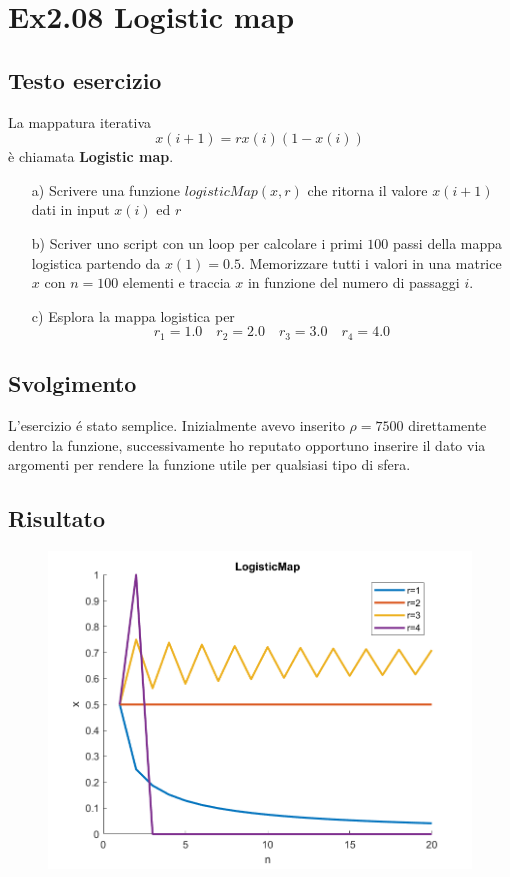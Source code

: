 \section{Ex2.08 Logistic map}\label{sec:LogisticMap}

\subsection{Testo esercizio}
La mappatura iterativa $$x(i+1)=rx(i)(1-x(i))$$ è chiamata \textbf{Logistic map}.

\begin{itemize}
    \item[a)] Scrivere una funzione $logisticMap(x,r)$ che ritorna il valore $x(i+1)$ 
    dati in input $x(i)$ ed $r$
    
    \item[b)] Scriver uno script con un loop per calcolare i primi $100$ passi della 
    mappa logistica partendo da $x(1)=0.5$. Memorizzare tutti i valori in una matrice $x$ 
    con $n=100$ elementi e traccia $x$ in funzione del numero di passaggi $i$.
    
    \item[c)] Esplora la mappa logistica per $$r_1=1.0\quad r_2=2.0\quad r_3=3.0\quad  
    r_4=4.0$$
    
\end{itemize}

\subsection{Svolgimento}
L'esercizio \'e stato semplice. Inizialmente avevo inserito $\rho=7500$ direttamente 
dentro la funzione, successivamente ho reputato opportuno inserire il dato via argomenti 
per rendere la funzione utile per qualsiasi tipo di sfera.

\subsection{Risultato}
\begin{figure}[h]
    \centering
    \includegraphics{cap/Elementary/img/script208}
    \label{fig:script208}
\end{figure}

